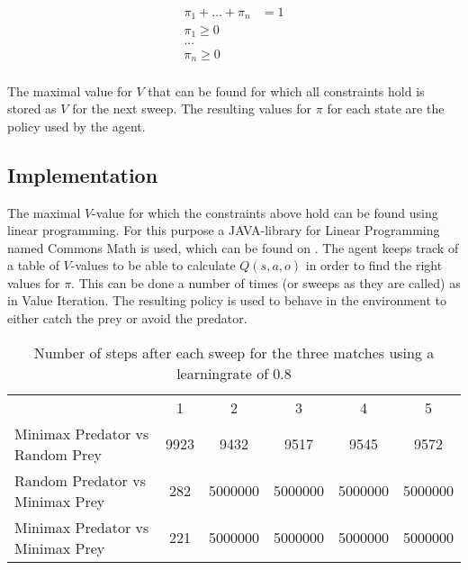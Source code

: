 \begin{align*}
\pi_1 + ... + \pi_n &= 1\\
\pi_1 \geq 0\\
...\\
\pi_n  \geq 0\\
\end{align*}

The maximal value for $V$ that can be found for which all constraints hold is stored as $V$ for the next sweep. The resulting values for $\pi$ for each state are the policy used by the agent.

\subsection{Implementation}
The maximal $V$-value for which the constraints above hold can be found using linear programming. For this purpose a JAVA-library for Linear Programming named Commons Math is used, which can be found on \cite{commonsmath}. The agent keeps track of a table of $V$-values to be able to calculate $Q(s,a,o)$ in order to find the right values for $\pi$. This can be done a number of times (or sweeps as they are called) as in Value Iteration. The resulting policy is used to behave in the environment to either catch the prey or avoid the predator.

\begin{table}[htb]
\centering
\begin{tabular}{lccccc}
&1&2&3&4&5\\
Minimax Predator vs Random Prey & 9923 & 9432&9517&9545&9572\\
Random Predator vs Minimax Prey & 282& 5000000& 5000000& 5000000& 5000000\\
Minimax Predator vs Minimax Prey & 221& 5000000& 5000000& 5000000& 5000000\\
\end{tabular}
\caption{Number of steps after each sweep for the three matches using a learningrate of 0.8}
\label{tab:minimaxTable}
\end{table}

\FloatBarrier

